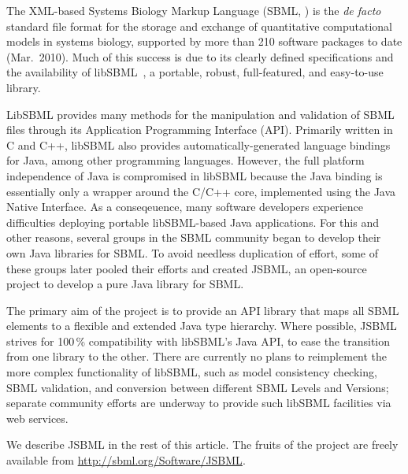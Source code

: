 \documentclass{bioinfo}
\begin{document}
The XML-based Systems Biology Markup Language (SBML, \citealt{M.Hucka03012003})
is the \emph{de facto} standard file format for the storage and exchange of
quantitative computational models in systems biology, supported by more than
210 software packages to date (Mar.~2010).
Much of this success is due to its
clearly defined specifications and the availability of libSBML~\citep{Bornstein2008},
a portable, robust, full-featured, and easy-to-use library.

LibSBML provides many methods for the manipulation and validation of
SBML files through its Application Programming Interface (API).
Primarily written in C and C++, libSBML also provides automatically-generated
language bindings for Java\texttrademark, among other programming languages.
However, the full platform independence of Java is compromised
in libSBML because the Java binding is essentially only a wrapper
around the C/C++ core, implemented using the Java Native Interface.
As a conseqeuence, many software developers experience difficulties 
deploying portable libSBML-based Java applications.
For this and other reasons, several groups in the SBML community began to
develop their own Java libraries for SBML. To avoid needless duplication of
effort, some of these groups later pooled their efforts and created JSBML, an
open-source project to develop a pure Java library for SBML.

The primary aim of the project is to provide an API library
that maps all SBML elements to a flexible and extended
Java type hierarchy. Where possible, JSBML strives for
100\,\% compatibility with libSBML's Java API, to ease the transition from
one library to the other. There are currently no plans to reimplement 
the more complex functionality of libSBML, such as model consistency checking,
SBML validation, and conversion between different SBML Levels and Versions;
separate community efforts are underway to provide such libSBML facilities
via web services.

We describe JSBML in the rest of this article.  The fruits of 
the project are freely available from
\href{http://sbml.org/Software/JSBML}{http://sbml.org/Software/JSBML}.


\end{document}
